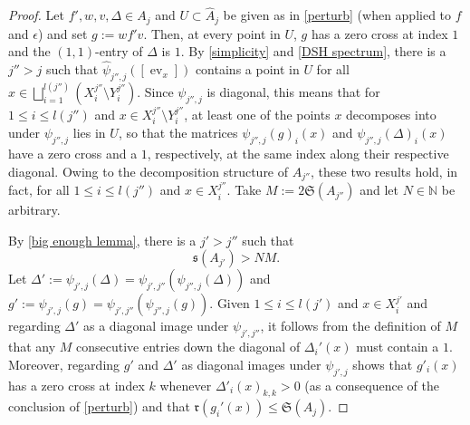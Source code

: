 \documentclass[12pt]{amsart}
\numberwithin{equation}{section}
\theoremstyle{definition}
\theoremstyle{remark}
\newcommand{\ev}{\operatorname{ev}}
\newcommand{\NN}{\mathbb{N}}
\begin{document}
\begin{proof}
	Let $f',w,v,\Delta\in A_{j}$ and $U\subset\hat{A}_{j}$ be given as in \autoref{perturb} (when applied to $f$ and $\epsilon$) and set $g:=wf'v$. Then, at every point in $U$, $g$ has a zero cross at index $1$ and the $(1,1)$-entry of $\Delta$ is $1$. By \autoref{simplicity} and \autoref{DSH spectrum}, there is a $j''>j$ such that $\hat{\psi}_{j'',j}([\ev_{x}])$ contains a point in $U$ for all $x\in \bigsqcup_{i=1}^{ l (j'')}(X_{i}^{j''}\setminus Y_{i}^{j''})$. Since $\psi_{j'',j}$ is diagonal, this means that for $1\leq i\leq l (j'')$ and $x\in X^{j''}_{i}\setminus Y_{i}^{j''}$, at least one of the points $x$ decomposes into under $\psi_{j'',j}$ lies in $U$, so that the matrices $\psi_{j'',j}(g)_{i}(x)$ and $\psi_{j'',j}(\Delta)_{i}(x)$ have a zero cross and a $1$, respectively, at the same index along their respective diagonal. Owing to the decomposition structure of $A_{j''}$, these two results hold, in fact, for all $1\leq i\leq  l (j'')$ and $x\in X_{i}^{j''}$. Take $M:=2\mathfrak{S}(A_{j''})$ and let $N\in\NN$ be arbitrary. 
	
	By \autoref{big enough lemma}, there is a $j'>j''$ such that 
	\begin{equation}
	\label{big enough}	
		\mathfrak{s}(A_{j'})>NM.
	\end{equation}
	Let $\Delta':=\psi_{j',j}(\Delta)=\psi_{j',j''}(\psi_{j'',j}(\Delta))$ and $g':=\psi_{j',j}(g)=\psi_{j',j''}(\psi_{j'',j}(g))$. Given $1\leq i\leq  l (j')$ and $x\in X^{j'}_{i}$ and regarding $\Delta'$ as a diagonal image under $\psi_{j',j''}$, it follows from the definition of $M$ that any $M$ consecutive entries down the diagonal of $\Delta_{i}'(x)$ must contain a $1$. Moreover, regarding $g'$ and $\Delta'$ as diagonal images under $\psi_{j',j}$ shows that $g'_{i}(x)$ has a zero cross at index $k$ whenever $\Delta'_{i}(x)_{k,k}>0$ (as a consequence of the conclusion of \autoref{perturb}) and that $\mathfrak{r}(g_{i}'(x))\leq \mathfrak{S}(A_{j})$.
	

\end{proof}
\end{document}
